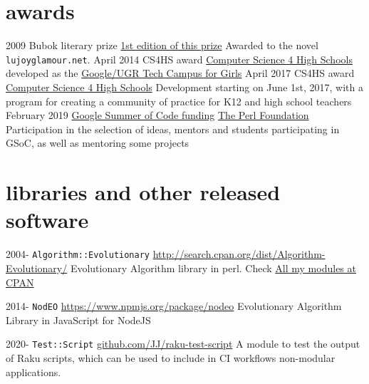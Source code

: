 \documentclass[]{friggeri-jj-cv}
\begin{document}
\section{awards}
\begin{entrylist}
 \entry
    {2009}
    {Bubok literary prize}
    {\href{http://cultura.elpais.com/cultura/2009/05/06/actualidad/1241560804_850215.html}{1st
        edition of this prize}}
    {Awarded to the novel {\tt lujoyglamour.net}.}
 \entry
    {April 2014}
    {CS4HS award}
    {\href{http://cs4hs.com}{Computer Science 4 High Schools}}
    {developed as the \href{http://cs4hs.ugr.es}{Google/UGR Tech Campus for Girls}}
 \entry
    {April 2017}
    {CS4HS award}
    {\href{http://cs4hs.com}{Computer Science 4 High Schools}}
    {Development starting on June 1st, 2017, with a program for
      creating a community of practice for K12 and high school
      teachers}
    \entry
    {February 2019}
    {\href{https://summerofcode.withgoogle.com/organizations/4713351599357952/}{Google
        Summer of Code funding}}
    {\href{https://www.perlfoundation.org/}{The Perl Foundation}}
    {Participation in the selection of ideas, mentors and students
      participating in GSoC, as well as mentoring some projects}

\end{entrylist}

\newpage

\section{libraries and other released software}

\begin{entrylist}
  \entry
    {2004-}
    {{\tt Algorithm::Evolutionary}}
    {\href{http://search.cpan.org/dist/Algorithm-Evolutionary/}{http://search.cpan.org/dist/Algorithm-Evolutionary/}}
    {Evolutionary Algorithm library in
      perl. Check \href{http://search.cpan.org/~jmerelo/}{All my modules at CPAN}}

    \entry
    {2014-}
    {{\tt NodEO}}
    {\href{https://npmjs.org/package/nodeo}{https://www.npmjs.org/package/nodeo}}
    {Evolutionary Algorithm Library in JavaScript for NodeJS}

    \entry
    {2020-}
    {{\tt Test::Script}}
    {\href{https://github.com/JJ/raku-test-script}{github.com/JJ/raku-test-script}}
    {A module to test the output of Raku scripts, which can be used to include in CI
    workflows non-modular applications.}

\end{entrylist}
\end{document}
